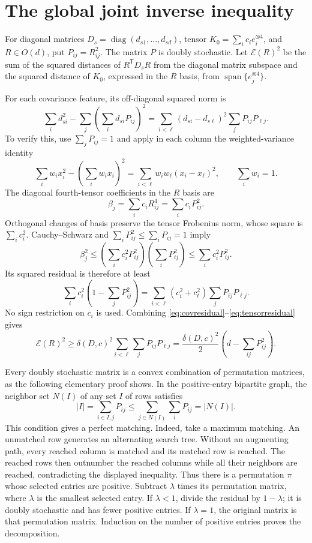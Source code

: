 \documentclass[11pt,a4paper]{article}
\numberwithin{equation}{section}
\newcommand{\T}{\mathsf T}
\DeclareMathOperator{\diag}{diag}
\begin{document}
\section{The global joint inverse inequality}\label{sec:inverse}
For diagonal matrices
\(D_s=\diag(d_{s1},\ldots,d_{sd})\), tensor
\(K_0=\sum_i c_ie_i^{\otimes4}\), and \(R\in O(d)\), put
\(P_{ij}=R_{ij}^2\). The matrix \(P\) is doubly stochastic.
Let \(\mathcal E(R)^2\) be the sum of the squared distances of
\(R^\T D_sR\) from the diagonal matrix subspace and the squared distance
of \(K_0\), expressed in the \(R\) basis, from
\(\operatorname{span}\{e_j^{\otimes4}\}\).

For each covariance feature, its off-diagonal squared norm is
\begin{equation}\label{eq:covresidual}
 \sum_i d_{si}^2-\sum_j\left(\sum_i d_{si}P_{ij}\right)^2
 =\sum_{i<\ell}(d_{si}-d_{s\ell})^2\sum_jP_{ij}P_{\ell j}.
\end{equation}
To verify this, use \(\sum_jP_{ij}=1\) and apply in each column the
weighted-variance identity
\[
 \sum_iw_ix_i^2-\left(\sum_iw_ix_i\right)^2
 =\sum_{i<\ell}w_iw_\ell(x_i-x_\ell)^2,\qquad \sum_iw_i=1.
\]
The diagonal fourth-tensor coefficients in the \(R\) basis are
\[
 \beta_j=\sum_i c_iR_{ij}^4=\sum_i c_iP_{ij}^2.
\]
Orthogonal changes of basis preserve the tensor Frobenius norm, whose
square is \(\sum_ic_i^2\). Cauchy--Schwarz and
\(\sum_iP_{ij}^2\le\sum_iP_{ij}=1\) imply
\[
 \beta_j^2
 \le\left(\sum_ic_i^2P_{ij}^2\right)\left(\sum_iP_{ij}^2\right)
 \le\sum_ic_i^2P_{ij}^2.
\]
Its squared residual is therefore at least
\begin{equation}\label{eq:tensorresidual}
 \sum_ic_i^2\left(1-\sum_jP_{ij}^2\right)
 =\sum_{i<\ell}(c_i^2+c_\ell^2)\sum_jP_{ij}P_{\ell j}.
\end{equation}
No sign restriction on \(c_i\) is used. Combining
\eqref{eq:covresidual}--\eqref{eq:tensorresidual} gives
\begin{equation}\label{eq:mixingdefect}
 \mathcal E(R)^2
 \ge\delta(D,c)^2\sum_{i<\ell}\sum_jP_{ij}P_{\ell j}
 =\frac{\delta(D,c)^2}{2}\left(d-\sum_{ij}P_{ij}^2\right).
\end{equation}

Every doubly stochastic matrix is a convex combination of permutation
matrices, as the following elementary proof shows.
In the positive-entry bipartite graph, the neighbor set \(N(I)\) of any
set \(I\) of rows satisfies
\[
 |I|=\sum_{i\in I,j}P_{ij}
 \le\sum_{j\in N(I)}\sum_iP_{ij}=|N(I)|.
\]
This condition gives a perfect matching. Indeed, take a maximum matching.
An unmatched row generates an alternating search tree. Without an
augmenting path, every reached column is matched and its matched row is
reached. The reached rows then outnumber the reached columns while all
their neighbors are reached, contradicting the displayed inequality.
Thus there is a permutation \(\pi\) whose selected entries are positive.
Subtract \(\lambda\) times its permutation matrix, where \(\lambda\) is the
smallest selected entry. If \(\lambda<1\), divide the residual by
\(1-\lambda\); it is doubly stochastic and has fewer positive entries.
If \(\lambda=1\), the original matrix is that permutation matrix.
Induction on the number of positive entries proves the decomposition.
\end{document}
